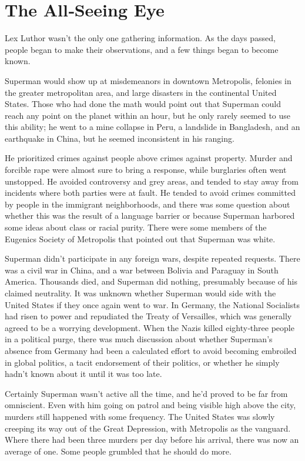 \chapter{The All‐Seeing Eye}\label{the-allseeing-eye}

Lex Luthor wasn't the only one gathering information. As the days
passed, people began to make their observations, and a few things began
to become known.

Superman would show up at misdemeanors in downtown Metropolis, felonies
in the greater metropolitan area, and large disasters in the continental
United States. Those who had done the math would point out that Superman
could reach any point on the planet within an hour, but he only rarely
seemed to use this ability; he went to a mine collapse in Peru, a
landslide in Bangladesh, and an earthquake in China, but he seemed
inconsistent in his ranging.

He prioritized crimes against people above crimes against property.
Murder and forcible rape were almost sure to bring a response, while
burglaries often went unstopped. He avoided controversy and grey areas,
and tended to stay away from incidents where both parties were at fault.
He tended to avoid crimes committed by people in the immigrant
neighborhoods, and there was some question about whether this was the
result of a language barrier or because Superman harbored some ideas
about class or racial purity. There were some members of the Eugenics
Society of Metropolis that pointed out that Superman was white.

Superman didn't participate in any foreign wars, despite repeated
requests. There was a civil war in China, and a war between Bolivia and
Paraguay in South America. Thousands died, and Superman did nothing,
presumably because of his claimed neutrality. It was unknown whether
Superman would side with the United States if they once again went to
war. In Germany, the National Socialists had risen to power and
repudiated the Treaty of Versailles, which was generally agreed to be a
worrying development. When the Nazis killed eighty‐three people in a
political purge, there was much discussion about whether Superman's
absence from Germany had been a calculated effort to avoid becoming
embroiled in global politics, a tacit endorsement of their politics, or
whether he simply hadn't known about it until it was too late.

Certainly Superman wasn't active all the time, and he'd proved to be far
from omniscient. Even with him going on patrol and being visible high
above the city, murders still happened with some frequency. The United
States was slowly creeping its way out of the Great Depression, with
Metropolis as the vanguard. Where there had been three murders per day
before his arrival, there was now an average of one. Some people
grumbled that he should do more.

